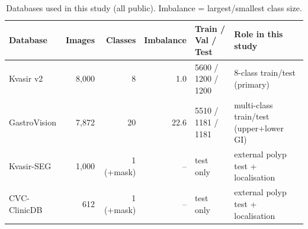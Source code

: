 \begin{table}[t]
\caption{Databases used in this study (all public). Imbalance = largest/smallest class size.}
\label{tab:datasets}\centering
\begin{tabular}{lrrrll}\toprule
Database & Images & Classes & Imbalance & Train / Val / Test & Role in this study\\\midrule
Kvasir v2 & 8,000 & 8 & 1.0 & 5600 / 1200 / 1200 & 8-class train/test (primary) \\
GastroVision & 7,872 & 20 & 22.6 & 5510 / 1181 / 1181 & multi-class train/test (upper+lower GI) \\
Kvasir-SEG & 1,000 & 1 (+mask) & -- & test only & external polyp test + localisation \\
CVC-ClinicDB & 612 & 1 (+mask) & -- & test only & external polyp test + localisation \\
\bottomrule\end{tabular}\end{table}
